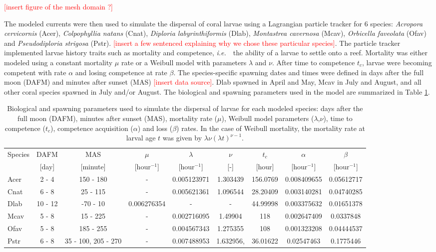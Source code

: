 \documentclass[fleqn,10pt]{wlscirep}
\newcommand{\ie}{{\it i.e.}\ }
\begin{document}
\textcolor{red}{[insert figure of the mesh domain ?]}

The modeled currents were then used to simulate the dispersal of coral larvae using a Lagrangian particle tracker for 6 species: \textit{Acropora cervicornis} (Acer), \textit{Colpophyllia natans} (Cnat), \textit{Diploria labyrinthiformis} (Dlab), \textit{Montastrea cavernosa} (Mcav), \textit{Orbicella faveolata} (Ofav) and \textit{Pseudodiploria strigosa} (Pstr). \textcolor{red}{[insert a few sentenced explaining why we chose these particular species]}. The particle tracker implemented larvae history traits such as mortality and competence, \ie~the ability of a larvae to settle onto a reef. Mortality was either modeled using a constant mortality $\mu$ rate or a Weibull model \citep{king2023larval} with parameters $\lambda$ and $\nu$. After time to competence $t_c$, larvae were becoming competent with rate $\alpha$ and losing competence at rate $\beta$. The species-specific spawning dates and times were defined in days after the full moon (DAFM) and minutes after sunset (MAS) \textcolor{red}{[insert data source]}. Dlab spawned in April and May, Mcav in July and August, and all other coral species spawned in July and/or August. The biological and spawning parameters used in the model are summarized in Table \ref{tab:species}. 

\begin{table}
    \centering
    \small
    \begin{tabular}{lcccccccc}
        \hline
        Species & DAFM & MAS & $\mu$ & $\lambda$ & $\nu$ & $t_c$ & $\alpha$ & $\beta$ \\
                & [day] & [minute] & [hour$^{-1}$] & [hour$^{-1}$] & [-] & [hour] & [hour$^{-1}$] & [hour$^{-1}$] \\
        \hline
        Acer & 2 - 4 & 150 - 180 & - & 0.005123971 & 1.303439 & 156.0769 & 0.008409655 & 0.05612717 \\
        Cnat & 6 - 8 & 25 - 115 & - & 0.005621361 & 1.096544 & 28.20409 & 0.003140281 & 0.04740285 \\
        Dlab & 10 - 12 & -70 - 10 & 0.006276354 & - & - & 44.99998 & 0.003375632 & 0.01651378 \\
        Mcav  & 5 - 8 & 15 - 225 & - & 0.002716095 & 1.49904 & 118 & 0.002647409 & 0.0337848 \\
        Ofav & 5 - 8 & 185 - 255 & - & 0.004567343 & 1.275355 & 108 & 0.001323208 & 0.04444537 \\
        Pstr & 6 - 8 &  35 - 100, 205 - 270 & - & 0.007488953 & 1.632956, & 36.01622 & 0.02547463 & 0.1775446 \\
        \hline
    \end{tabular}
    \caption{Biological and spawning parameters used to simulate the dispersal of larvae for each modeled species: days after the full moon (DAFM), minutes after sunset (MAS), mortality rate ($\mu$), Weibull model parameters ($\lambda$,$\nu$), time to competence ($t_c$), competence acquisition ($\alpha$) and loss ($\beta$) rates. In the case of Weibull mortality, the mortality rate at larval age $t$ was given by $\lambda\nu(\lambda t)^{\nu-1}$.}\label{tab:species}
\end{table}
\end{document}
